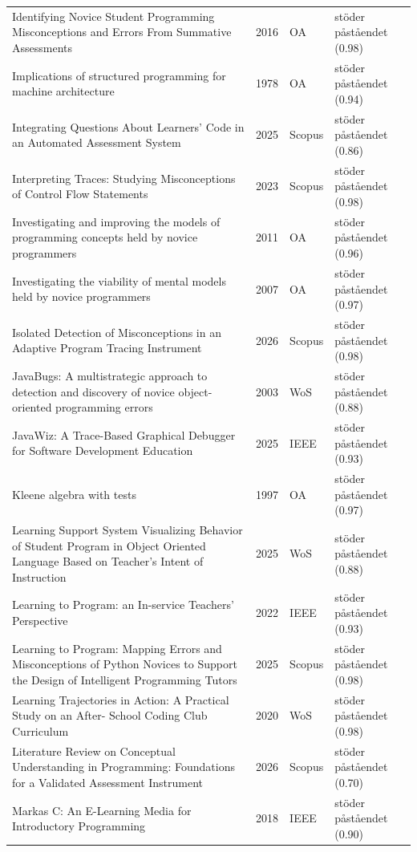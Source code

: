 \begin{longtable}{@{}%
  >{\raggedright\arraybackslash}p{}c%
  >{\raggedright\arraybackslash}p{}%
  >{\raggedright\arraybackslash}p{}@{}}
Identifying Novice Student Programming Misconceptions and Errors From Summative Assessments & 2016 & OA & stöder påståendet (0.98) \\
Implications of structured programming for machine architecture & 1978 & OA & stöder påståendet (0.94) \\
Integrating Questions About Learners' Code in an Automated Assessment System & 2025 & Scopus & stöder påståendet (0.86) \\
Interpreting Traces: Studying Misconceptions of Control Flow Statements & 2023 & Scopus & stöder påståendet (0.98) \\
Investigating and improving the models of programming concepts held by novice programmers & 2011 & OA & stöder påståendet (0.96) \\
Investigating the viability of mental models held by novice programmers & 2007 & OA & stöder påståendet (0.97) \\
Isolated Detection of Misconceptions in an Adaptive Program Tracing Instrument & 2026 & Scopus & stöder påståendet (0.98) \\
JavaBugs: A multistrategic approach to detection and discovery of novice object-oriented programming errors & 2003 & WoS & stöder påståendet (0.88) \\
JavaWiz: A Trace-Based Graphical Debugger for Software Development Education & 2025 & IEEE & stöder påståendet (0.93) \\
Kleene algebra with tests & 1997 & OA & stöder påståendet (0.97) \\
Learning Support System Visualizing Behavior of Student Program in Object Oriented Language Based on Teacher's Intent of Instruction & 2025 & WoS & stöder påståendet (0.88) \\
Learning to Program: an In-service Teachers' Perspective & 2022 & IEEE & stöder påståendet (0.93) \\
Learning to Program: Mapping Errors and Misconceptions of Python Novices to Support the Design of Intelligent Programming Tutors & 2025 & Scopus & stöder påståendet (0.98) \\
Learning Trajectories in Action: A Practical Study on an After- School Coding Club Curriculum & 2020 & WoS & stöder påståendet (0.98) \\
Literature Review on Conceptual Understanding in Programming: Foundations for a Validated Assessment Instrument & 2026 & Scopus & stöder påståendet (0.70) \\
Markas C: An E-Learning Media for Introductory Programming & 2018 & IEEE & stöder påståendet (0.90) \\

\end{longtable}
